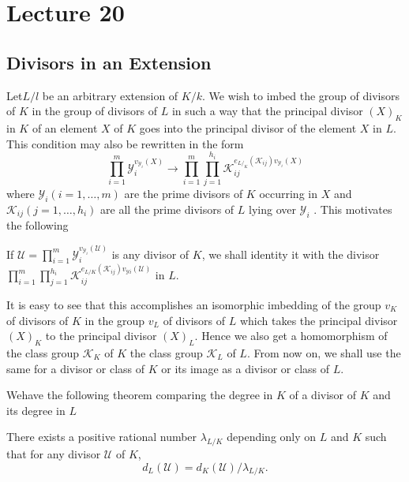 \chapter{Lecture 20}\label{chap20} %

\setcounter{section}{33}
\section{Divisors in an Extension}\label{chap20:sec34}%

Let\pageoriginale $L /l$ be an arbitrary extension  of $K /k$. We wish to imbed the
group of divisors of $K$ in the group of divisors of $L$ in such a way
that the principal divisor $(X)_K$ in $K$ of an element $X$ of $K$
goes into the principal divisor of the element $X$ in $L$.  
This condition may also be rewritten in the form   
$$
\prod_{i=1}^{m} \mathscr{Y}_i^{v_{\mathscr{Y}_i}{(X)}} \longrightarrow
\prod_{i=1}^m \prod_{j=1}^{h_i} \mathscr{K}_{ij}^{e_{L/
  _K}(\mathscr{K}_{ij}) v_{\mathscr{Y}_i}(X)} 
$$
where $\mathscr{Y}_i (i=1, \ldots , m)$ are the prime divisors of $K$
occurring in $X$ and $\mathscr{K}_{ij} (j=1, \ldots , h_i)$ are all the
prime divisors of $L$ lying over $\mathscr{Y}_i$ . This motivates the
following 

\begin{defi*}%
  If $\mathscr{U}= \prod\limits_{i=1}^m \mathscr{Y}_i^{
  v_{\mathscr{Y}_i} {(\mathscr{U})}}$ is any divisor of $K$, we shall
  identity it with the divisor $\prod\limits_{i=1}^m
  \prod\limits_{j=1}^{h_i} \mathscr{K}_{ij}^{e_{L/K}(\mathscr{K}_{ij})
  v_{\mathscr{Y}i}(\mathscr{U})}$ in $L$. 
\end{defi*}

It is easy to see that this accomplishes an isomorphic imbedding of
the group $v_K$ of divisors of $K$ in the group $v_L$ of
divisors of $L$ which  takes the principal divisor $(X)_K$ to the
principal  divisor $(X)_L$. Hence we also get a homomorphism of the
class group $\mathscr{K}_K$ of $K$ the class group $\mathscr{K}_L$ of
$L$. From  now on, we shall use the same for  a divisor or class of
$K$ or its image as a divisor or class of $L$. 

We\pageoriginale have the following  theorem comparing  the degree in $K$ of a
divisor of $K$ and its degree in $L$ 

\begin{theorem*}%
  There exists a positive rational number $\lambda_{L /K}$ depending
  only on $L$ and $K$ such that for any divisor $\mathscr{U}$ of $K$, 
  $$
  d_L (\mathscr{U}) = d_K (\mathscr{U})/\lambda_{L /K}.
  $$
\end{theorem*}

